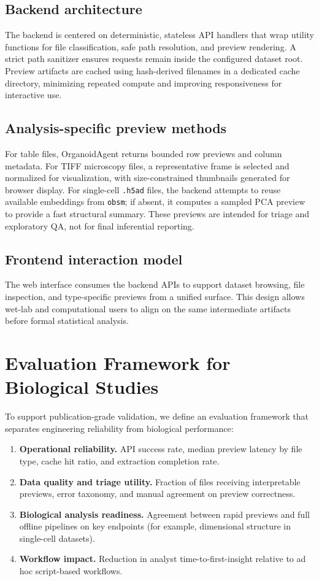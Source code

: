 \documentclass[11pt]{article}
\begin{document}
\subsection{Backend architecture}
The backend is centered on deterministic, stateless API handlers that wrap utility functions for file classification, safe path resolution, and preview rendering. A strict path sanitizer ensures requests remain inside the configured dataset root. Preview artifacts are cached using hash-derived filenames in a dedicated cache directory, minimizing repeated compute and improving responsiveness for interactive use.

\subsection{Analysis-specific preview methods}
For table files, OrganoidAgent returns bounded row previews and column metadata. For TIFF microscopy files, a representative frame is selected and normalized for visualization, with size-constrained thumbnails generated for browser display. For single-cell \texttt{.h5ad} files, the backend attempts to reuse available embeddings from \texttt{obsm}; if absent, it computes a sampled PCA preview to provide a fast structural summary. These previews are intended for triage and exploratory QA, not for final inferential reporting.

\subsection{Frontend interaction model}
The web interface consumes the backend APIs to support dataset browsing, file inspection, and type-specific previews from a unified surface. This design allows wet-lab and computational users to align on the same intermediate artifacts before formal statistical analysis.

\section{Evaluation Framework for Biological Studies}
To support publication-grade validation, we define an evaluation framework that separates engineering reliability from biological performance:

\begin{enumerate}
\item \textbf{Operational reliability.} API success rate, median preview latency by file type, cache hit ratio, and extraction completion rate.
\item \textbf{Data quality and triage utility.} Fraction of files receiving interpretable previews, error taxonomy, and manual agreement on preview correctness.
\item \textbf{Biological analysis readiness.} Agreement between rapid previews and full offline pipelines on key endpoints (for example, dimensional structure in single-cell datasets).
\item \textbf{Workflow impact.} Reduction in analyst time-to-first-insight relative to ad hoc script-based workflows.
\end{enumerate}
\end{document}
